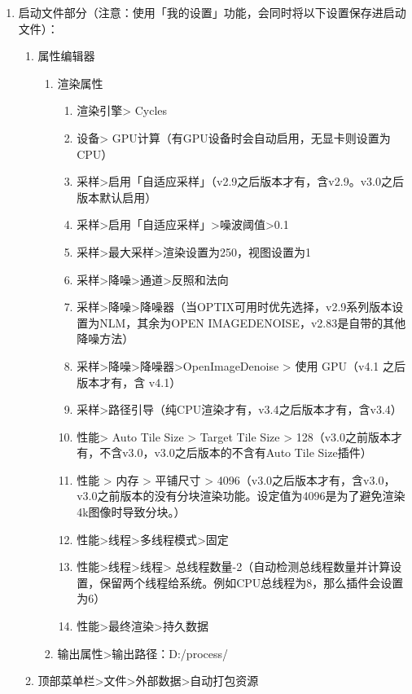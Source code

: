 \documentclass{../../public_resources/doc}
\begin{document}
\begin{enumerate}
\begin{enumerate}
\begin{enumerate}
        \end{enumerate}
    \end{enumerate}
    \item 启动文件部分（注意：使用「我的设置」功能，会同时将以下设置保存进启动文件）：
    \begin{enumerate}
        \item 属性编辑器
        \begin{enumerate}
            \item 渲染属性
            \begin{enumerate}
                \item 渲染引擎> Cycles
                \item 设备> GPU计算（有GPU设备时会自动启用，无显卡则设置为CPU）
                \item 采样>启用「自适应采样」（v2.9之后版本才有，含v2.9。v3.0之后版本默认启用）
                \item 采样>启用「自适应采样」>噪波阈值>0.1
                \item 采样>最大采样>渲染设置为250，视图设置为1
                \item 采样>降噪>通道>反照和法向
                \item 采样>降噪>降噪器（当OPTIX可用时优先选择，v2.9系列版本设置为NLM，其余为OPEN IMAGEDENOISE，v2.83是自带的其他降噪方法）
                \item 采样>降噪>降噪器>OpenImageDenoise > 使用 GPU（v4.1 之后版本才有，含 v4.1）
                \item 采样>路径引导（纯CPU渲染才有，v3.4之后版本才有，含v3.4）
                \item 性能> Auto Tile Size > Target Tile Size > 128（v3.0之前版本才有，不含v3.0，v3.0之后版本的不含有Auto Tile Size插件）
                \item 性能 > 内存  > 平铺尺寸 > 4096（v3.0之后版本才有，含v3.0，v3.0之前版本的没有分块渲染功能。设定值为4096是为了避免渲染4k图像时导致分块。）
                \item 性能>线程>多线程模式>固定
                \item 性能>线程>线程> 总线程数量-2（自动检测总线程数量并计算设置，保留两个线程给系统。例如CPU总线程为8，那么插件会设置为6）
                \item 性能>最终渲染>持久数据
            \end{enumerate}
            \item 输出属性>输出路径：D:/process/
        \end{enumerate}
        \item 顶部菜单栏>文件>外部数据>自动打包资源
    \end{enumerate}
\end{enumerate}
\end{document}

